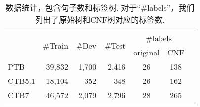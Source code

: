 \begin{table}[tb!]
    \centering
    \caption{数据统计，包含句子数和标签树.
        对于``\#labels''，我们列出了原始树和CNF树对应的标签数.}
    \begin{tabular}{lrrr|ccc}
        \toprule
               & \multirow{2}{*}{\#Train} & \multirow{2}{*}{\#Dev} & \multirow{2}{*}{\#Test} & \multicolumn{2}{c}{\#labels}       \\
               &                          &                        &                         & original                     & CNF \\[1pt]
        \midrule
        PTB    & 39,832                   & 1,700                  & 2,416                   & 26                           & 138 \\
        CTB5.1 & 18,104                   & 352                    & 348                     & 26                           & 162 \\
        CTB7   & 46,572                   & 2,079                  & 2,796                   & 28                           & 265 \\
        \bottomrule
    \end{tabular}
    \label{table:con-statistics}
\end{table}